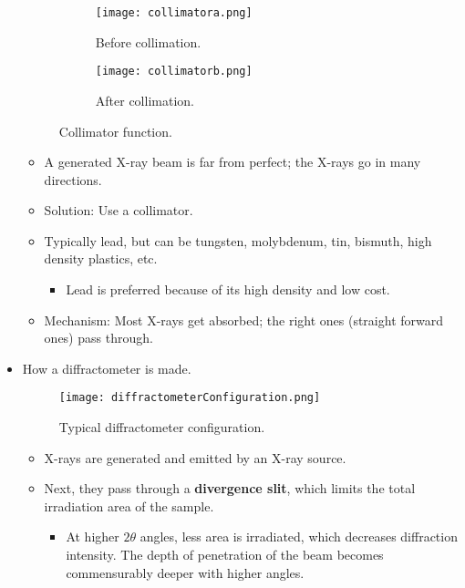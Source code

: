 \documentclass[../notes.tex]{subfiles}
\begin{document}
\begin{itemize}
\begin{figure}[H]
        \centering
        \begin{subfigure}[b]{0.3\linewidth}
            \centering
            \texttt{[image: collimatora.png]}
            \caption{Before collimation.}
            \label{fig:collimatora}
        \end{subfigure}
        \begin{subfigure}[b]{0.3\linewidth}
            \centering
            \texttt{[image: collimatorb.png]}
            \caption{After collimation.}
            \label{fig:collimatorb}
        \end{subfigure}
        \caption{Collimator function.}
        \label{fig:collimator}
    \end{figure}
    \begin{itemize}
        \item A generated X-ray beam is far from perfect; the X-rays go in many directions.
        \item Solution: Use a collimator.
        \item Typically lead, but can be tungsten, molybdenum, tin, bismuth, high density plastics, etc.
        \begin{itemize}
            \item Lead is preferred because of its high density and low cost.
        \end{itemize}
        \item Mechanism: Most X-rays get absorbed; the right ones (straight forward ones) pass through.
    \end{itemize}
    \item How a diffractometer is made.
    \begin{figure}[h!]
        \centering
        \texttt{[image: diffractometerConfiguration.png]}
        \caption{Typical diffractometer configuration.}
        \label{fig:diffractometerConfiguration}
    \end{figure}
    \begin{itemize}
        \item X-rays are generated and emitted by an X-ray source.
        \item Next, they pass through a \textbf{divergence slit}, which limits the total irradiation area of the sample.
        \begin{itemize}
            \item At higher $2\theta$ angles, less area is irradiated, which decreases diffraction intensity. The depth of penetration of the beam becomes commensurably deeper with higher angles.

\end{itemize}
\end{itemize}
\end{itemize}
\end{document}

